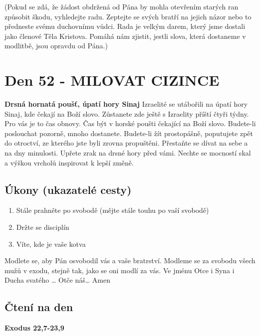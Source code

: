 \documentclass[11pt]{article}
\newcommand{\zacatekOsmyTyden}{
  \textbf{Drsná hornatá poušť, úpatí hory Sinaj} \newline 
  Izraelité se utábořili na úpatí hory Sinaj, kde čekají na Boží slovo. Zůstanete zde ještě s Izraelity příští čtyři týdny. Pro vás je to čas obnovy. Čas být v horské poušti čekající na Boží slovo. Budete-li poslouchat pozorně, mnoho dostanete. Budete-li žít prostopášně, poputujete zpět do otroctví, ze kterého jste byli zrovna propuštěni. Přestaňte se dívat na sebe a na dny minulosti. Upřete zrak na drsné hory před vámi. Nechte se mocností skal a výškou vrcholů inspirovat k lepší změně.
  \subsection*{Úkony (ukazatelé cesty)}
\begin{enumerate}
  \item Stále prahněte po svobodě (mějte stále touhu po vaší svobodě)
  \item Držte se disciplín
  \item Víte, kde je vaše kotva
\end{enumerate}
Modlete se, aby Pán osvobodil vás a vaše bratrství. \newline
Modleme se za svobodu všech mužů v exodu, stejně tak, jako se oni modlí za vás.\newline
Ve jménu Otce i Syna i Ducha svatého …  Otče náš… Amen
}
\begin{document}
(Pokud se zdá, že žádost obdržená od Pána by mohla otevřením starých ran způsobit škodu, vyhledejte radu. Zeptejte
se svých bratří na jejich názor nebo to předneste svému duchovnímu vůdci. Rada je velkým darem, který jsme dostali
jako členové Těla Kristova. Pomáhá nám zjistit, jestli slova, která dostaneme v modlitbě, jsou opravdu od Pána.)

\newpage
\section{Den 52 - MILOVAT CIZINCE }
\zacatekOsmyTyden
\subsection*{Čtení na den}
\textbf{Exodus 22,7-23,9}
\newline
\end{document}
